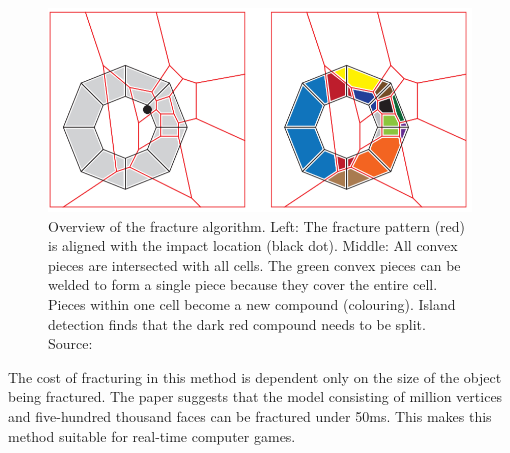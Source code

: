 \begin{figure}
\centering
        \includegraphics[width=\textwidth]{img/vacdAlgorithm}
        \caption{Overview of the fracture algorithm. Left: The fracture pattern (red) is aligned with the impact location (black dot). Middle: All
convex pieces are intersected with all cells. The green convex pieces can be welded to form a single piece because they cover the entire
cell. Pieces within one cell become a new compound (colouring). Island detection finds that the dark red compound needs to be split. Source: \citet{nvidia}}
        \label{fig:vacdalg}
\end{figure}

The cost of fracturing in this method is dependent only on the size of the object being fractured. The paper suggests that the model consisting of million vertices and five-hundred thousand faces can be fractured under 50ms. This makes this method suitable for real-time computer games.






